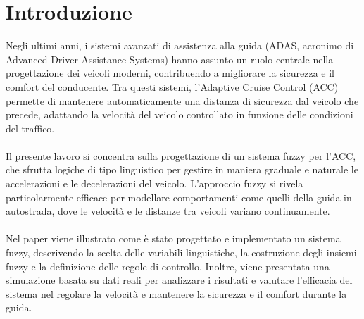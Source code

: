 \chapter*{Introduzione}  
Negli ultimi anni, i sistemi avanzati di assistenza alla guida (ADAS, acronimo di Advanced Driver Assistance Systems) hanno assunto 
un ruolo centrale nella progettazione dei veicoli moderni, contribuendo a migliorare la sicurezza e il comfort del conducente. 
Tra questi sistemi, l'Adaptive Cruise Control (ACC) permette di mantenere automaticamente una distanza di sicurezza dal 
veicolo che precede, adattando la velocità del veicolo controllato in funzione delle condizioni del traffico.
\\\\
\noindent Il presente lavoro si concentra sulla progettazione di un sistema fuzzy per l'ACC, che sfrutta logiche di tipo 
linguistico per gestire in maniera graduale e naturale le accelerazioni e le decelerazioni del veicolo. L'approccio 
fuzzy si rivela particolarmente efficace per modellare comportamenti come quelli della guida in autostrada,
dove le velocità e le distanze tra veicoli variano continuamente.
\\\\
\noindent Nel paper viene illustrato come è stato progettato e implementato un sistema fuzzy, descrivendo la scelta 
delle variabili linguistiche, la costruzione degli insiemi fuzzy e la definizione delle regole di controllo. Inoltre, 
viene presentata una simulazione basata su dati reali per analizzare i risultati e valutare l'efficacia del sistema nel 
regolare la velocità e mantenere la sicurezza e il comfort durante la guida.



